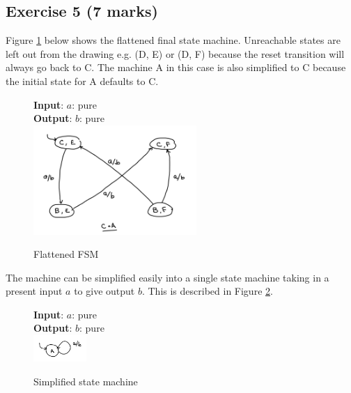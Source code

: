 \documentclass[11pt]{article}
\begin{document}
\subsection*{Exercise 5 (7 marks)}
Figure \ref{fig:Ch5Ex5} below shows the flattened final state machine.  Unreachable states are left out from the drawing e.g. (D, E) or (D, F) because the reset transition will always go back to C. The machine A in this case is also simplified to C because the initial state for A defaults to C.
\begin{figure}[H]
    \centering
    \textbf{Input}: $a$: pure\\
    \textbf{Output}: $b$: pure\\
    \includegraphics[width=6.2cm]{Ch5Ex5.jpeg}
    \caption{Flattened FSM}
    \label{fig:Ch5Ex5}
\end{figure}
The machine can be simplified easily into a single state machine taking in a present input $a$ to give output $b$. This is described in Figure \ref{fig:Ch5Ex5a}.
\begin{figure}[H]
    \centering
    \textbf{Input}: $a$: pure\\
    \textbf{Output}: $b$: pure\\
    \includegraphics[width=2cm]{Ch5Ex5a.jpeg}
    \caption{Simplified state machine}
    \label{fig:Ch5Ex5a}
\end{figure}
\end{document}
